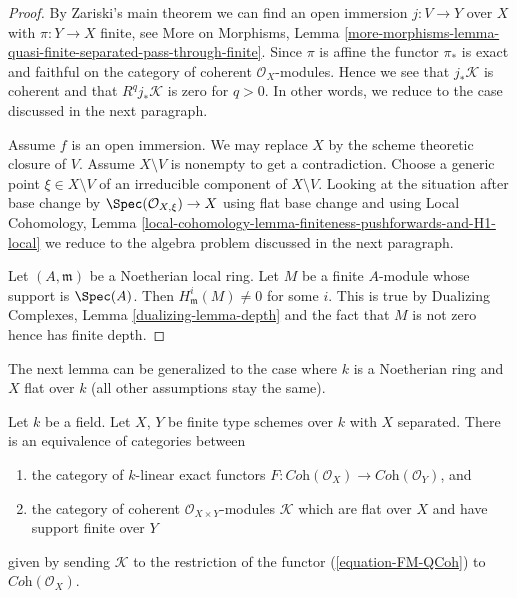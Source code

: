 \begin{proof}
By Zariski's main theorem we can find an open immersion
$j : V \to Y$ over $X$ with $\pi : Y \to X$ finite, see
More on Morphisms, Lemma
\ref{more-morphisms-lemma-quasi-finite-separated-pass-through-finite}.
Since $\pi$ is affine the functor $\pi_*$ is exact and faithful
on the category of coherent $\mathcal{O}_X$-modules.
Hence we see that $j_*\mathcal{K}$ is coherent and
that $R^qj_*\mathcal{K}$ is zero for $q > 0$.
In other words, we reduce to the case discussed in the next paragraph.

\medskip\noindent
Assume $f$ is an open immersion. We may replace $X$ by the
scheme theoretic closure of $V$. Assume $X \setminus V$ is nonempty
to get a contradiction. Choose a generic point $\xi \in X \setminus V$
of an irreducible component of $X \setminus V$. Looking at the situation
after base change by $\Spec(\mathcal{O}_{X, \xi}) \to X$ using flat base
change and using
Local Cohomology, Lemma
\ref{local-cohomology-lemma-finiteness-pushforwards-and-H1-local}
we reduce to the algebra problem discussed in the next paragraph.

\medskip\noindent
Let $(A, \mathfrak m)$ be a Noetherian local ring. Let $M$ be a finite
$A$-module whose support is $\Spec(A)$. Then $H^i_\mathfrak m(M) \not = 0$
for some $i$. This is true by
Dualizing Complexes, Lemma \ref{dualizing-lemma-depth}
and the fact that $M$ is not zero hence has finite depth.
\end{proof}

\noindent
The next lemma can be generalized to the case where $k$ is a
Noetherian ring and $X$ flat over $k$ (all other assumptions
stay the same).

\begin{lemma}
\label{lemma-functor-coherent-over-field}
Let $k$ be a field. Let $X$, $Y$ be finite type schemes over $k$ with
$X$ separated. There is an equivalence of categories between
\begin{enumerate}
\item the category of $k$-linear exact functors
$F : \textit{Coh}(\mathcal{O}_X) \to \textit{Coh}(\mathcal{O}_Y)$, and
\item the category of coherent $\mathcal{O}_{X \times Y}$-modules
$\mathcal{K}$ which are flat over $X$ and have support finite over $Y$
\end{enumerate}
given by sending $\mathcal{K}$ to the restriction of the functor
(\ref{equation-FM-QCoh}) to $\textit{Coh}(\mathcal{O}_X)$.
\end{lemma}

